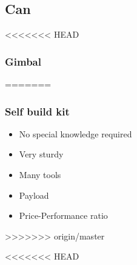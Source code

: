 \subsection{Can}

\begin{frame}
<<<<<<< HEAD
\frametitle{Gimbal}

=======
\frametitle{Self build kit}

  \begin{itemize}
    \item No special knowledge required    
	\item Very sturdy
	\item Many tools
	\item Payload    
	\item Price-Performance ratio
  \end{itemize}
>>>>>>> origin/master
  
\end{frame}



<<<<<<< HEAD

